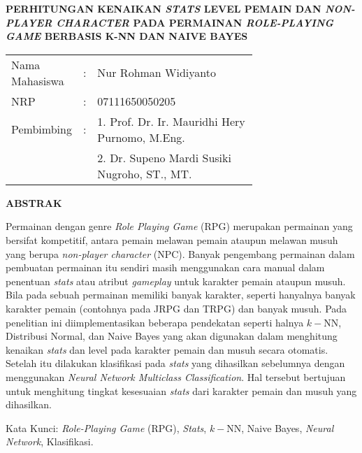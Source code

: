 \begin{spacing}{1}
	\begin{center}
		\large\textbf{PERHITUNGAN KENAIKAN \textit{STATS} LEVEL PEMAIN DAN \textit{NON-PLAYER CHARACTER} PADA PERMAINAN \textit{ROLE-PLAYING GAME} BERBASIS K-NN DAN NAIVE BAYES}
	\end{center}
	\vspace{2ex}
	
	\begin{adjustwidth}{-0.2cm}{}
		\begin{tabular}{lcp{0.7\linewidth}}
			Nama Mahasiswa &:& Nur Rohman Widiyanto \\
			NRP &:&	07111650050205 \\
			Pembimbing &:& 1. Prof. Dr. Ir. Mauridhi Hery Purnomo, M.Eng. \\
			& & 2. Dr. Supeno Mardi Susiki Nugroho, ST., MT. \\
		\end{tabular}
	\end{adjustwidth}
	\vspace{2ex}
	
	\begin{center}
		\large\textbf{ABSTRAK}
	\end{center}
	\vspace{1ex}
	
	Permainan dengan genre \textit{Role Playing Game} (RPG) merupakan permainan yang bersifat kompetitif, antara pemain melawan pemain ataupun melawan musuh yang berupa \textit{non-player character} (NPC). Banyak pengembang permainan dalam pembuatan permainan itu sendiri masih menggunakan cara manual dalam penentuan \textit{stats} atau atribut \textit{gameplay} untuk karakter pemain ataupun musuh. Bila pada sebuah permainan memiliki banyak karakter, seperti hanyalnya banyak karakter pemain (contohnya pada JRPG dan TRPG) dan banyak musuh. Pada penelitian ini diimplementasikan beberapa pendekatan seperti halnya $k-$NN, Distribusi Normal, dan Naive Bayes yang akan digunakan dalam menghitung kenaikan \textit{stats} dan level pada karakter pemain dan musuh secara otomatis. Setelah itu dilakukan klasifikasi pada \textit{stats} yang dihasilkan sebelumnya dengan menggunakan \textit{Neural Network Multiclass Classification}. Hal tersebut bertujuan untuk menghitung tingkat kesesuaian \textit{stats} dari karakter pemain dan musuh yang dihasilkan. 
	\vspace{2ex}
	

	Kata Kunci: \textit{Role-Playing Game} (RPG), \textit{Stats}, $k-$NN, Naive Bayes, \textit{Neural Network}, Klasifikasi.
\end{spacing}